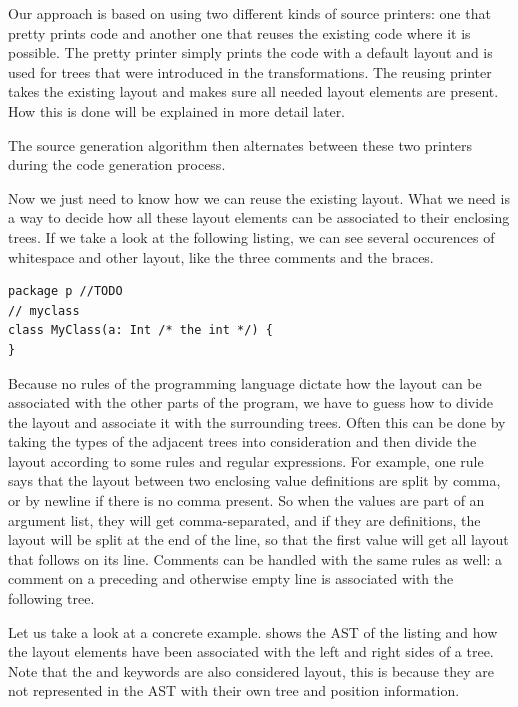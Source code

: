 \documentclass[10pt,a4paper,oneside]{scrreprt}
\begin{document}
Our approach is based on using two different kinds of source printers: one that pretty prints code  and another one that reuses the existing code where it is possible. The pretty printer simply prints the code with a default layout and is used for trees that were introduced in the transformations. The reusing printer takes the existing layout and makes sure all needed layout elements are present. How this is done will be explained in more detail later.

The source generation algorithm then alternates between these two printers during the code generation process.

Now we just need to know how we can reuse the existing layout. What we need is a way to decide how all these layout elements can be associated to their enclosing trees. If we take a look at the following listing, we can see several occurences of whitespace and other layout, like the three comments and the braces.

\begin{lstlisting}
package p //TODO
// myclass
class MyClass(a: Int /* the int */) {
}
\end{lstlisting}

Because no rules of the programming language dictate how the layout can be associated with the other parts of the program, we have to guess how to divide the layout and associate it with the surrounding trees. Often this can be done by taking the types of the adjacent trees into consideration and then divide the layout according to some rules and regular expressions. For example, one rule says that the layout between two enclosing value definitions are split by comma, or by newline if there is no comma present. So when the values are part of an argument list, they will get comma-separated, and if they are definitions, the layout will be split at the end of the line, so that the first value will get all layout that follows on its line. Comments can be handled with the same rules as well: a comment on a preceding and otherwise empty line is associated with the following tree.

Let us take a look at a concrete example.  shows the AST of the listing and how the layout elements have been associated with the left and right sides of a tree. Note that the  and  keywords are also considered layout, this is because they are not represented in the AST with their own tree and position information.
\end{document}
